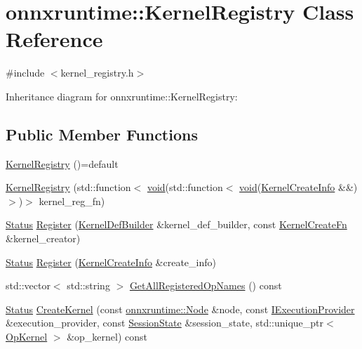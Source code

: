 \hypertarget{classonnxruntime_1_1KernelRegistry}{}\section{onnxruntime\+:\+:Kernel\+Registry Class Reference}
\label{classonnxruntime_1_1KernelRegistry}


{\ttfamily \#include $<$kernel\+\_\+registry.\+h$>$}



Inheritance diagram for onnxruntime\+:\+:Kernel\+Registry\+:
\subsection*{Public Member Functions}
\begin{DoxyCompactItemize}
\item 
\mbox{\hyperlink{classonnxruntime_1_1KernelRegistry_a8cf1430354125b884cb971db39a09bfc}{Kernel\+Registry}} ()=default
\item 
\mbox{\hyperlink{classonnxruntime_1_1KernelRegistry_a1ed25e686743eb25c3f94a8ff4c47fc4}{Kernel\+Registry}} (std\+::function$<$ \mbox{\hyperlink{mlasi_8h_a88f941d423cb2a819b70a1358982b1a6}{void}}(std\+::function$<$ \mbox{\hyperlink{mlasi_8h_a88f941d423cb2a819b70a1358982b1a6}{void}}(\mbox{\hyperlink{structonnxruntime_1_1KernelCreateInfo}{Kernel\+Create\+Info}} \&\&)$>$)$>$ kernel\+\_\+reg\+\_\+fn)
\item 
\mbox{\hyperlink{classonnxruntime_1_1common_1_1Status}{Status}} \mbox{\hyperlink{classonnxruntime_1_1KernelRegistry_af81f6acb9b02212303a1b4e6fa7b1d42}{Register}} (\mbox{\hyperlink{classonnxruntime_1_1KernelDefBuilder}{Kernel\+Def\+Builder}} \&kernel\+\_\+def\+\_\+builder, const \mbox{\hyperlink{namespaceonnxruntime_a2e23731e78afbe4e5e15a18493162335}{Kernel\+Create\+Fn}} \&kernel\+\_\+creator)
\item 
\mbox{\hyperlink{classonnxruntime_1_1common_1_1Status}{Status}} \mbox{\hyperlink{classonnxruntime_1_1KernelRegistry_a9b9a95e6d65ac684c71024d32b56163a}{Register}} (\mbox{\hyperlink{structonnxruntime_1_1KernelCreateInfo}{Kernel\+Create\+Info}} \&create\+\_\+info)
\item 
std\+::vector$<$ std\+::string $>$ \mbox{\hyperlink{classonnxruntime_1_1KernelRegistry_a33e9c2ab5a8ed53cfca517b228d5d9fb}{Get\+All\+Registered\+Op\+Names}} () const
\item 
\mbox{\hyperlink{classonnxruntime_1_1common_1_1Status}{Status}} \mbox{\hyperlink{classonnxruntime_1_1KernelRegistry_a812ae91800b74bcbe37a682ab94f4477}{Create\+Kernel}} (const \mbox{\hyperlink{classonnxruntime_1_1Node}{onnxruntime\+::\+Node}} \&node, const \mbox{\hyperlink{classonnxruntime_1_1IExecutionProvider}{I\+Execution\+Provider}} \&execution\+\_\+provider, const \mbox{\hyperlink{classonnxruntime_1_1SessionState}{Session\+State}} \&session\+\_\+state, std\+::unique\+\_\+ptr$<$ \mbox{\hyperlink{classonnxruntime_1_1OpKernel}{Op\+Kernel}} $>$ \&op\+\_\+kernel) const

\end{DoxyCompactItemize}
